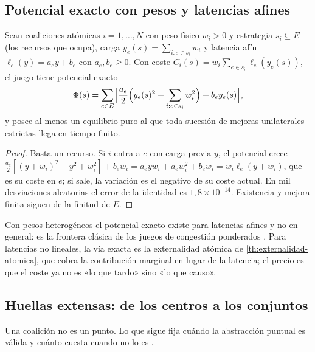 \subsection{Potencial exacto con pesos y latencias afines}

\begin{proposicion}
\label{pr:potencial-afin-ponderado}
Sean coaliciones atómicas $i=1,\dots,N$ con peso físico $w_i>0$ y estrategia
$s_i\subseteq E$ (los recursos que ocupa), carga $y_e(s)=\sum_{i:e\in s_i}w_i$
y latencia afín $\ell_e(y)=a_ey+b_e$ con $a_e,b_e\ge0$. Con coste
$C_i(s)=w_i\sum_{e\in s_i}\ell_e(y_e(s))$, el juego tiene potencial exacto
\begin{equation}
  \label{eq:potencial-afin}
  \Phi(s)=\sum_{e\in E}\Bigl[\frac{a_e}{2}\Bigl(y_e(s)^2+\sum_{i:e\in s_i}w_i^2\Bigr)+b_ey_e(s)\Bigr],
\end{equation}
y posee al menos un equilibrio puro al que toda sucesión de mejoras
unilaterales estrictas llega en tiempo finito.
\end{proposicion}

\begin{proof}
Basta un recurso. Si $i$ entra a $e$ con carga previa $y$, el potencial
crece $\tfrac{a_e}{2}[(y+w_i)^2-y^2+w_i^2]+b_ew_i=a_eyw_i+a_ew_i^2+b_ew_i
=w_i\ell_e(y+w_i)$, que es su coste en $e$; si sale, la variación es el
negativo de su coste actual. En mil desviaciones aleatorias el error de la
identidad es $1{,}8\times10^{-14}$. Existencia y mejora finita siguen de la
finitud de $E$.
\end{proof}

\begin{observacion}
\label{obs:afin-limite}
Con pesos heterogéneos el potencial exacto existe para latencias afines y
no en general: es la frontera clásica de los juegos de congestión ponderados
\cite{fotakis2005selfish}. Para latencias no lineales, la vía exacta es la
externalidad atómica de \cref{th:externalidad-atomica}, que cobra la
contribución marginal en lugar de la latencia; el precio es que el coste ya
no es «lo que tardo» sino «lo que causo».
\end{observacion}

\subsection{Huellas extensas: de los centros a los conjuntos}

Una coalición no es un punto. Lo que sigue fija cuándo la abstracción puntual
es válida y cuánto cuesta cuando no lo es \cite{mayorga2026compendio}.

